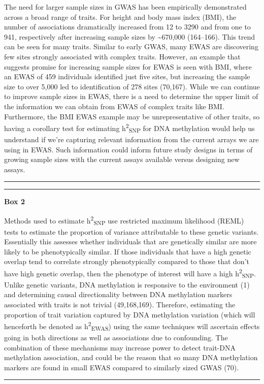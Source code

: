 \documentclass[11pt,oneside]{bristolthesis}
\begin{document}
The need for larger sample sizes in GWAS has been empirically demonstrated across a broad range of traits. For height and body mass index (BMI), the number of associations dramatically increased from 12 to 3290 and from one to 941, respectively after increasing sample sizes by \textasciitilde670,000 (164--166). This trend can be seen for many traits. Similar to early GWAS, many EWAS are discovering few sites strongly associated with complex traits. However, an example that suggests promise for increasing sample sizes for EWAS is seen with BMI, where an EWAS of 459 individuals identified just five sites, but increasing the sample size to over 5,000 led to identification of 278 sites (70,167). While we can continue to improve sample sizes in EWAS, there is a need to determine the upper limit of the information we can obtain from EWAS of complex traits like BMI. Furthermore, the BMI EWAS example may be unrepresentative of other traits, so having a corollary test for estimating h\textsuperscript{2}\textsubscript{SNP} for DNA methylation would help us understand if we're capturing relevant information from the current arrays we are using in EWAS. Such information could inform future study designs in terms of growing sample sizes with the current assays available versus designing new assays.
\begin{center}\rule{0.5\linewidth}{0.5pt}\end{center}
\begin{center}\rule{0.5\linewidth}{0.5pt}\end{center}

\textbf{Box 2}

Methods used to estimate h\textsuperscript{2}\textsubscript{SNP} use restricted maximum likelihood (REML) tests to estimate the proportion of variance attributable to these genetic variants. Essentially this assesses whether individuals that are genetically similar are more likely to be phenotypically similar. If those individuals that have a high genetic overlap tend to correlate strongly phenotypically compared to those that don't have high genetic overlap, then the phenotype of interest will have a high h\textsuperscript{2}\textsubscript{SNP}. Unlike genetic variants, DNA methylation is responsive to the environment (1) and determining causal directionality between DNA methylation markers associated with traits is not trivial (49,168,169). Therefore, estimating the proportion of trait variation captured by DNA methylation variation (which will henceforth be denoted as h\textsuperscript{2}\textsubscript{EWAS}) using the same techniques will ascertain effects going in both directions as well as associations due to confounding. The combination of these mechanisms may increase power to detect trait-DNA methylation association, and could be the reason that so many DNA methylation markers are found in small EWAS compared to similarly sized GWAS (70).
\begin{center}\rule{0.5\linewidth}{0.5pt}\end{center}
\end{document}
